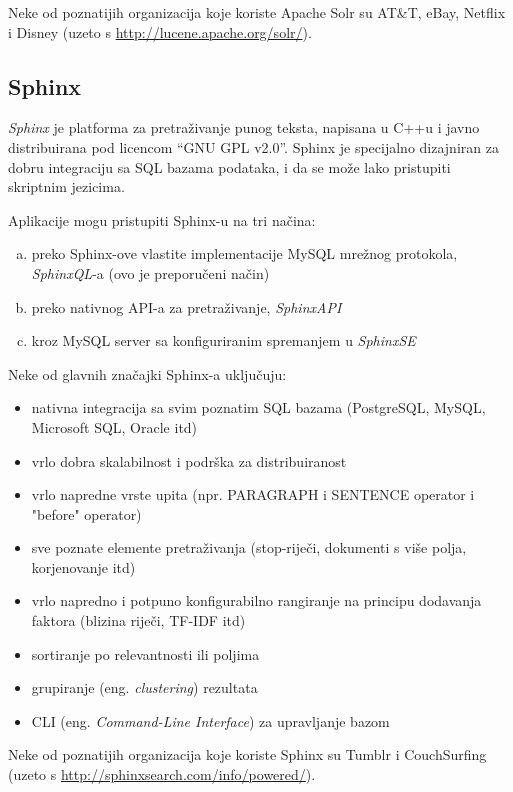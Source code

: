 \documentclass[a4paper,twoside,12pt]{scrreprt}
\begin{document}
Neke od poznatijih organizacija koje koriste Apache Solr su AT\&T, eBay, Netflix i Disney (uzeto s \url{http://lucene.apache.org/solr/}).

\subsection{Sphinx}

\textit{Sphinx} je platforma za pretraživanje punog teksta, napisana u C++u i javno distribuirana pod licencom ``GNU GPL v2.0''. Sphinx je specijalno dizajniran za dobru integraciju sa SQL bazama podataka, i da se može lako pristupiti skriptnim jezicima.

Aplikacije mogu pristupiti Sphinx-u na tri načina:

\begin{enumerate}[(a)]
  \item preko Sphinx-ove vlastite implementacije MySQL mrežnog protokola, \textit{SphinxQL}-a (ovo je preporučeni način)
  \item preko nativnog API-a za pretraživanje, \textit{SphinxAPI}
  \item kroz MySQL server sa konfiguriranim spremanjem u \textit{SphinxSE}
\end{enumerate}

Neke od glavnih značajki Sphinx-a uključuju:

\begin{itemize}
  \item nativna integracija sa svim poznatim SQL bazama (PostgreSQL, MySQL, Microsoft SQL, Oracle itd)
  \item vrlo dobra skalabilnost i podrška za distribuiranost
  \item vrlo napredne vrste upita (npr. PARAGRAPH i SENTENCE operator i "before" operator)
  \item sve poznate elemente pretraživanja (stop-riječi, dokumenti s više polja, korjenovanje itd)
  \item vrlo napredno i potpuno konfigurabilno rangiranje na principu dodavanja faktora (blizina riječi, TF-IDF itd)
  \item sortiranje po relevantnosti ili poljima
  \item grupiranje (eng. \textit{clustering}) rezultata
  \item CLI (eng. \textit{Command-Line Interface}) za upravljanje bazom
\end{itemize}

Neke od poznatijih organizacija koje koriste Sphinx su Tumblr i CouchSurfing (uzeto s \url{http://sphinxsearch.com/info/powered/}).
\end{document}
